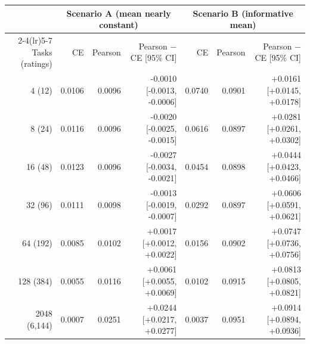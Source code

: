 \begin{tabular}{@{}rrrrrrr@{}}
\toprule
 & \multicolumn{3}{c}{Scenario A (mean nearly constant)} & \multicolumn{3}{c}{Scenario B (informative mean)} \\
\cmidrule(lr){2-4}\cmidrule(lr){5-7}
Tasks (ratings) & CE & Pearson & Pearson $-$ CE [95\% CI] & CE & Pearson & Pearson $-$ CE [95\% CI] \\
\midrule
4 (12) & 0.0106 & 0.0096 & -0.0010 [-0.0013, -0.0006] & 0.0740 & 0.0901 & +0.0161 [+0.0145, +0.0178] \\
8 (24) & 0.0116 & 0.0096 & -0.0020 [-0.0025, -0.0015] & 0.0616 & 0.0897 & +0.0281 [+0.0261, +0.0302] \\
16 (48) & 0.0123 & 0.0096 & -0.0027 [-0.0034, -0.0021] & 0.0454 & 0.0898 & +0.0444 [+0.0423, +0.0466] \\
32 (96) & 0.0111 & 0.0098 & -0.0013 [-0.0019, -0.0007] & 0.0292 & 0.0897 & +0.0606 [+0.0591, +0.0621] \\
64 (192) & 0.0085 & 0.0102 & +0.0017 [+0.0012, +0.0022] & 0.0156 & 0.0902 & +0.0747 [+0.0736, +0.0756] \\
128 (384) & 0.0055 & 0.0116 & +0.0061 [+0.0055, +0.0069] & 0.0102 & 0.0915 & +0.0813 [+0.0805, +0.0821] \\
2048 (6,144) & 0.0007 & 0.0251 & +0.0244 [+0.0217, +0.0277] & 0.0037 & 0.0951 & +0.0914 [+0.0894, +0.0936] \\
\bottomrule
\end{tabular}
